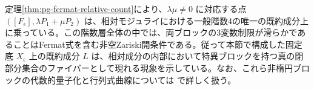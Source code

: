 定理\ref{thm:pg-fermat-relative-count}により、$\lambda\mu\ne0$ に対応する点 $([F_\epsilon],\lambda P_1+\mu P_2)$ は、相対モジュライにおける一般階数4の唯一の既約成分上に乗っている。この階数層全体の中では、両ブロックの3変数制限が滑らかであることはFermat式を含む非空Zariski開条件である。従って本節で構成した固定底 $X_\epsilon$ 上の既約成分 $L$ は、相対成分の内部において特異ブロックを持つ真の閉部分集合のファイバーとして現れる現象を示している。なお、これら非楕円ブロックの代数的量子化と行列式曲線については \cite{CubicQuantization} で詳しく扱う。
